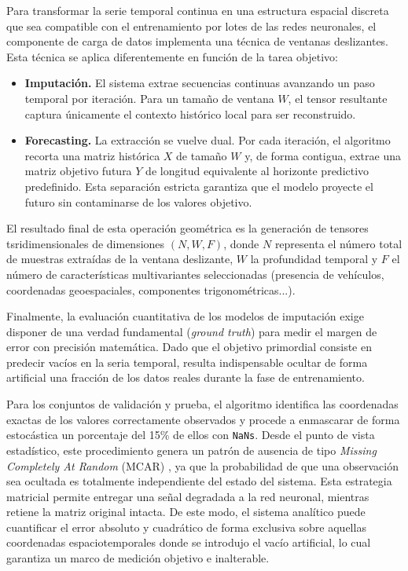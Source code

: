 Para transformar la serie temporal continua en una estructura espacial discreta que sea compatible con el entrenamiento por lotes de las redes neuronales, el componente de carga de datos implementa una técnica de ventanas deslizantes. Esta técnica se aplica diferentemente en función de la tarea objetivo:

\begin{itemize}
	\item \textbf{Imputación.} El sistema extrae secuencias continuas avanzando un paso temporal por iteración. Para un tamaño de ventana $W$, el tensor resultante captura únicamente el contexto histórico local para ser reconstruido.
	\item \textbf{Forecasting.} La extracción se vuelve dual. Por cada iteración, el algoritmo recorta una matriz histórica $X$ de tamaño $W$ y, de forma contigua, extrae una matriz objetivo futura $Y$ de longitud equivalente al horizonte predictivo predefinido. Esta separación estricta garantiza que el modelo proyecte el futuro sin contaminarse de los valores objetivo.
\end{itemize}

El resultado final de esta operación geométrica es la generación de tensores tsridimensionales de dimensiones $(N, W, F)$, donde $N$ representa el número total de muestras extraídas de la ventana deslizante, $W$ la profundidad temporal y $F$ el número de características multivariantes seleccionadas (presencia de vehículos, coordenadas geoespaciales, componentes trigonométricas...).

Finalmente, la evaluación cuantitativa de los modelos de imputación exige disponer de una verdad fundamental (\textit{ground truth}) para medir el margen de error con precisión matemática. Dado que el objetivo primordial consiste en predecir vacíos en la seria temporal, resulta indispensable ocultar de forma artificial una fracción de los datos reales durante la fase de entrenamiento.

Para los conjuntos de validación y prueba, el algoritmo identifica las coordenadas exactas de los valores correctamente observados y procede a enmascarar de forma estocástica un porcentaje del 15\% de ellos con \texttt{NaNs}. Desde el punto de vista estadístico, este procedimiento genera un patrón de ausencia de tipo \textit{Missing Completely At Random} (MCAR) \cite{rubin1976inference}, ya que la probabilidad de que una observación sea ocultada es totalmente independiente del estado del sistema. Esta estrategia matricial permite entregar una señal degradada a la red neuronal, mientras retiene la matriz original intacta. De este modo, el sistema analítico puede cuantificar el error absoluto y cuadrático de forma exclusiva sobre aquellas coordenadas espaciotemporales donde se introdujo el vacío artificial, lo cual garantiza un marco de medición objetivo e inalterable.

